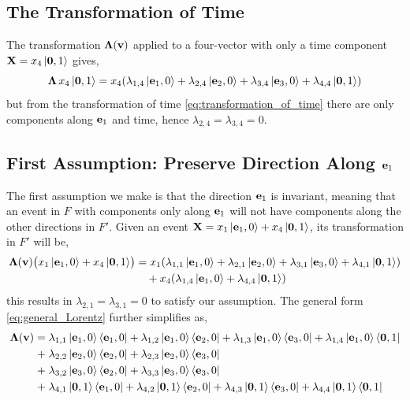 \documentclass[12pt]{article}
\begin{document}
\subsection{The Transformation of Time}

The transformation $\boldsymbol{\Lambda}(\vb{v})$ applied to a four-vector with only a time
component $\vb{X} = x_4\ket{\vb{0},1}$ gives,
\begin{equation}
  \boldsymbol{\Lambda}\, x_4\ket{\vb{0},1}
  = x_4\!\left(
      \lambda_{1,4}\ket{\vb{e}_1,0}
    + \lambda_{2,4}\ket{\vb{e}_2,0}
    + \lambda_{3,4}\ket{\vb{e}_3,0}
    + \lambda_{4,4}\ket{\vb{0},1}
  \right)
\end{equation}
but from the transformation of time \eqref{eq:transformation_of_time} there are only
components along $\vb{e}_1$ and time, hence $\lambda_{2,4} = \lambda_{3,4} = 0$.

\subsection{First Assumption: Preserve Direction Along $\vb{e}_1$}

The first assumption we make is that the direction $\vb{e}_1$ is invariant, meaning that an
event in $F$ with components only along $\vb{e}_1$ will not have components along the other
directions in $F'$. Given an event
$\vb{X} = x_1\ket{\vb{e}_1, 0} + x_4\ket{\vb{0}, 1}$, its transformation in $F'$ will be,
\begin{equation}
  \begin{aligned}
    \boldsymbol{\Lambda}(\vb{v})\bigl(x_1\ket{\vb{e}_1,0} + x_4\ket{\vb{0},1}\bigr)
    &= x_1\!\left(
        \lambda_{1,1}\ket{\vb{e}_1,0}
      + \lambda_{2,1}\ket{\vb{e}_2,0}
      + \lambda_{3,1}\ket{\vb{e}_3,0}
      + \lambda_{4,1}\ket{\vb{0},1}
    \right) \\
    &\quad + x_4\!\left(\lambda_{1,4}\ket{\vb{e}_1,0} + \lambda_{4,4}\ket{\vb{0},1}\right)
  \end{aligned}
\end{equation}
this results in $\lambda_{2,1} = \lambda_{3,1} = 0$ to satisfy our assumption.
The general form \eqref{eq:general_Lorentz} further simplifies as,
\begin{equation}
  \begin{aligned}
    \boldsymbol{\Lambda}(\vb{v}) =\;
      &\lambda_{1,1}\ket{\vb{e}_1,0}\bra{\vb{e}_1,0}
      + \lambda_{1,2}\ket{\vb{e}_1,0}\bra{\vb{e}_2,0}
      + \lambda_{1,3}\ket{\vb{e}_1,0}\bra{\vb{e}_3,0}
      + \lambda_{1,4}\ket{\vb{e}_1,0}\bra{\vb{0},1} \\
    +\;&\lambda_{2,2}\ket{\vb{e}_2,0}\bra{\vb{e}_2,0}
      + \lambda_{2,3}\ket{\vb{e}_2,0}\bra{\vb{e}_3,0} \\
    +\;&\lambda_{3,2}\ket{\vb{e}_3,0}\bra{\vb{e}_2,0}
      + \lambda_{3,3}\ket{\vb{e}_3,0}\bra{\vb{e}_3,0} \\
    +\;&\lambda_{4,1}\ket{\vb{0},1}\bra{\vb{e}_1,0}
      + \lambda_{4,2}\ket{\vb{0},1}\bra{\vb{e}_2,0}
      + \lambda_{4,3}\ket{\vb{0},1}\bra{\vb{e}_3,0}
      + \lambda_{4,4}\ket{\vb{0},1}\bra{\vb{0},1}
  \end{aligned}
\end{equation}
\end{document}
